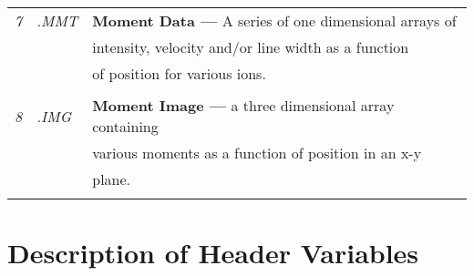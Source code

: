 \begin{center}
\begin{tabular}{||l l l||}
{\em 7} & {\em .MMT} & {\bf Moment Data ---} A series of one dimensional arrays of
 \\

        &            & intensity, velocity and/or line width as a function \\
        &            & of position for various ions. \\
        &            &                               \\     

{\em 8} & {\em .IMG} & {\bf Moment Image ---} a three dimensional array containing 
\\
        &            &  various moments as a function of position in an x-y \\
        &            &  plane. \\
        &            & \\
\hline
\end{tabular}
\end{center}

\newpage

\section{Description of Header Variables}

